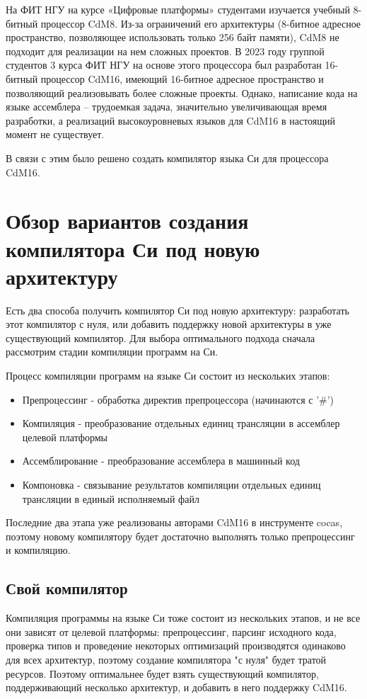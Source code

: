 \documentclass[a4paper,14pt]{extarticle}
\begin{document}
На ФИТ НГУ на курсе «Цифровые платформы» студентами изучается учебный 8-битный процессор CdM8. Из-за ограничений его архитектуры (8-битное адресное пространство, позволяющее использовать только 256 байт памяти), CdM8 не подходит для реализации на нем сложных проектов. В 2023 году группой студентов 3 курса ФИТ НГУ на основе этого процессора был разработан 16-битный процессор CdM16, имеющий 16-битное адресное пространство и позволяющий реализовывать более сложные проекты. Однако, написание кода на языке ассемблера – трудоемкая задача, значительно увеличивающая время разработки, а реализаций высокоуровневых языков для CdM16 в настоящий момент не существует.

В связи с этим было решено создать компилятор языка Си для процессора CdM16.

\pagebreak
\section{Обзор вариантов создания компилятора Си под новую архитектуру}

Есть два способа получить компилятор Си под новую архитектуру: разработать этот компилятор с нуля, или добавить поддержку новой архитектуры в уже существующий компилятор. Для выбора оптимального подхода сначала рассмотрим стадии компиляции программ на Си.

Процесс компиляции программ на языке Си состоит из нескольких этапов\cite{cpp_compilation}:
\begin{itemize}
	\item Препроцессинг - обработка директив препроцессора (начинаются с '\#')
	\item Компиляция - преобразование отдельных единиц трансляции в ассемблер целевой платформы
	\item Ассемблирование - преобразование ассемблера в машинный код
	\item Компоновка - связывание результатов компиляции отдельных единиц трансляции в единый исполняемый файл
\end{itemize}

Последние два этапа уже реализованы авторами CdM16 в инструменте cocas, поэтому новому компилятору будет достаточно выполнять только препроцессинг и компиляцию. 

\subsection{Свой компилятор}

Компиляция программы на языке Си тоже состоит из нескольких этапов, и не все они зависят от целевой платформы:
препроцессинг, парсинг исходного кода, проверка типов и проведение некоторых оптимизаций производятся одинаково 
для всех архитектур, поэтому создание компилятора "с нуля" будет тратой ресурсов. 
Поэтому оптимальнее будет взять существующий компилятор, поддерживающий несколько архитектур, и добавить в него
поддержку CdM16.
\end{document}
